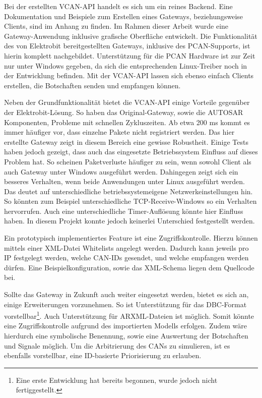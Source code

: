 \documentclass[
  a4paper,					    %
  twoside,
  DIV=calc,     				%
  bibliography=totoc,
  cleardoublepage=empty,
  ngerman,     					%
  final       					%
]{scrbook}
\begin{document}
Bei der erstellten VCAN-API handelt es sich um ein reines Backend. Eine Dokumentation und Beispiele zum Erstellen eines Gateways, beziehungsweise Clients, sind im Anhang zu finden. Im Rahmen dieser Arbeit wurde eine Gateway-Anwendung inklusive grafische Oberfläche entwickelt. Die Funktionalität des von Elektrobit bereitgestellten Gateways, inklusive des PCAN-Supports, ist hierin komplett nachgebildet. Unterstützung für die PCAN Hardware ist zur Zeit nur unter Windows gegeben, da sich die entsprechenden Linux-Treiber noch in der Entwicklung befinden. Mit der VCAN-API lassen sich ebenso einfach Clients erstellen, die Botschaften senden und empfangen können.

Neben der Grundfunktionalität bietet die VCAN-API einige Vorteile gegenüber der Elektrobit-Lösung. So haben das Original-Gateway, sowie die AUTOSAR Komponenten, Probleme mit schnellen Zykluszeiten. Ab etwa 200 ms kommt es immer häufiger vor, dass einzelne Pakete nicht registriert werden. Das hier erstellte Gateway zeigt in diesem Bereich eine gewisse Robustheit. Einige Tests haben jedoch gezeigt, dass auch das eingesetzte Betriebssystem Einfluss auf dieses Problem hat. So scheinen Paketverluste häufiger zu sein, wenn sowohl Client als auch Gateway unter Windows ausgeführt werden. Dahingegen zeigt sich ein besseres Verhalten, wenn beide Anwendungen unter Linux ausgeführt werden. Das deutet auf unterschiedliche betriebssystemeigene Netzwerkeinstellungen hin. So könnten zum Beispiel unterschiedliche TCP-Receive-Windows so ein Verhalten hervorrufen. Auch eine unterschiedliche Timer-Auflösung könnte hier Einfluss haben. In diesem Projekt konnte jedoch keinerlei Unterschied festgestellt werden.

Ein prototypisch implementiertes Feature ist eine Zugriffskontrolle. Hierzu können mittels einer XML-Datei Whitelists angelegt werden. Dadurch kann jeweils pro IP festgelegt werden, welche CAN-IDs gesendet, und welche empfangen werden dürfen. Eine Beispielkonfiguration, sowie das XML-Schema liegen dem Quellcode bei.

Sollte das Gateway in Zukunft auch weiter eingesetzt werden, bietet es sich an, einige Erweiterungen vorzunehmen. So ist Unterstützung für das DBC-Format vorstellbar\footnote{Eine erste Entwicklung hat bereits begonnen, wurde jedoch nicht fertiggestellt.}. Auch Unterstützung für ARXML-Dateien ist möglich. Somit könnte eine Zugriffskontrolle aufgrund des importierten Modells erfolgen. Zudem wäre hierdurch eine symbolische Benennung, sowie eine Auswertung der Botschaften und Signale möglich. Um die Arbitrierung des CANs zu simulieren, ist es ebenfalls vorstellbar, eine ID-basierte Priorisierung zu erlauben.
\end{document}
